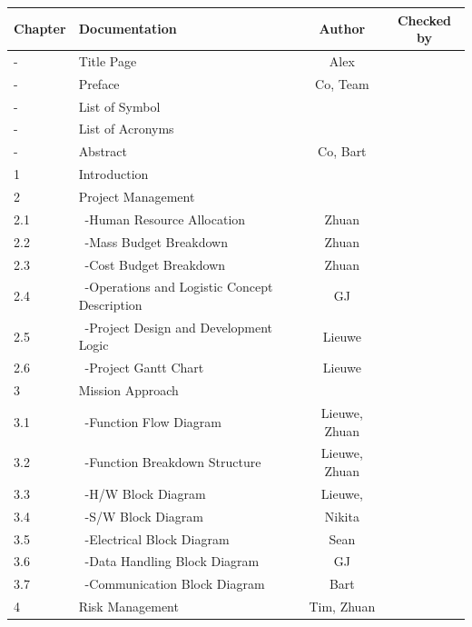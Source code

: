 \newpage
\begin{center}
\begin{longtable}{|l|l|c|c|}\hline
 Chapter & Documentation                      & Author & Checked by \\\hline 
 -       & Title Page                           & Alex   & \\\hline                  
 -       & Preface                              & Co, Team& \\\hline
 -       & List of Symbol                       &&\\\hline
 -       & List of Acronyms                       &&\\\hline
 -       & Abstract                             & Co, Bart &\\\hline
 1       & Introduction                         &&\\\hline\hline
 2       & Project Management                   &&\\\hline
 2.1     & \ -Human Resource Allocation         & Zhuan &\\\hline
 2.2     & \ -Mass Budget Breakdown             & Zhuan &\\\hline
 2.3     & \ -Cost Budget Breakdown             & Zhuan &\\\hline
 2.4     & \ -Operations and Logistic Concept Description & GJ &\\\hline
 2.5     & \ -Project Design and Development Logic & Lieuwe &\\\hline
 2.6     & \ -Project Gantt Chart               & Lieuwe &\\\hline\hline
 3       & Mission Approach                     &&\\\hline
 3.1     & \ -Function Flow Diagram             & Lieuwe, Zhuan & \\\hline
 3.2     & \ -Function Breakdown Structure      & Lieuwe, Zhuan &\\\hline
 3.3     & \ -H/W Block Diagram                 & Lieuwe, &\\\hline
 3.4     & \ -S/W Block Diagram                 & Nikita &\\\hline
 3.5     & \ -Electrical Block Diagram          & Sean &\\\hline
 3.6     & \ -Data Handling Block Diagram       & GJ &\\\hline
 3.7     & \ -Communication Block Diagram       & Bart &\\\hline
 4       & Risk Management                      & Tim, Zhuan & \\\hline\hline

\end{longtable}
\end{center}
